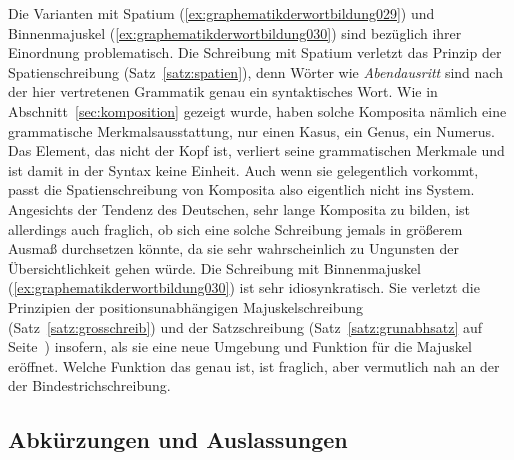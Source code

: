 Die Varianten mit Spatium (\ref{ex:graphematikderwortbildung029}) und Binnenmajuskel (\ref{ex:graphematikderwortbildung030}) sind bezüglich ihrer Einordnung problematisch.
Die Schreibung mit Spatium verletzt das Prinzip der Spatienschreibung (Satz~\ref{satz:spatien}), denn Wörter wie \textit{Abendausritt} sind nach der hier vertretenen Grammatik genau ein syntaktisches Wort.
Wie in Abschnitt~\ref{sec:komposition} gezeigt wurde, haben solche Komposita nämlich eine grammatische Merkmalsausstattung, \zB nur einen Kasus, ein Genus, ein Numerus.
Das Element, das nicht der Kopf ist, verliert seine grammatischen Merkmale und ist damit in der Syntax keine Einheit.
Auch wenn sie gelegentlich vorkommt, passt die Spatienschreibung von Komposita also eigentlich nicht ins System.
Angesichts der Tendenz des Deutschen, sehr lange Komposita zu bilden, ist allerdings auch fraglich, ob sich eine solche Schreibung jemals in größerem Ausmaß durchsetzen könnte, da sie sehr wahrscheinlich zu Ungunsten der Übersichtlichkeit gehen würde.
Die Schreibung mit Binnenmajuskel (\ref{ex:graphematikderwortbildung030}) ist sehr idiosynkratisch.
Sie verletzt die Prinzipien der positionsunabhängigen Majuskelschreibung (Satz~\ref{satz:grosschreib}) und der Satzschreibung (Satz~\ref{satz:grunabhsatz} auf Seite~\pageref{satz:grunabhsatz}) insofern, als sie eine neue Umgebung und Funktion für die Majuskel eröffnet.
Welche Funktion das genau ist, ist fraglich, aber vermutlich nah an der der Bindestrichschreibung.

\subsection{Abkürzungen und Auslassungen}
\label{sec:abkuerzungenundauslassungen}


